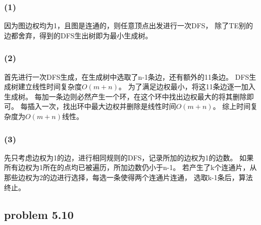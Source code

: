 \documentclass[11pt,a4paper,oneside,oldfontcommands]{ctexart}
\begin{document}
\subsubsection*{(1)}
因为图边权均为1，且图是连通的，则任意顶点出发进行一次DFS，
除了TE别的边都舍弃，得到的DFS生出树即为最小生成树。
\subsubsection*{(2)}
首先进行一次DFS生成，在生成树中选取了n-1条边，还有额外的11条边。
DFS生成树建立线性时间复杂度$O(m+n)$。
为了满足边权最小，将这11条边逐一加入生成树。
每加一条边则必然产生一个环，在这个环中找出边权最大的将其删除即可。
每插入一次，找出环中最大边权并删除是线性时间$O(m+n)$。
综上时间复杂度为$O(m+n)线性$。
\subsubsection*{(3)}
先只考虑边权为1的边，进行相同规则的DFS，记录所加的边权为1的边数。
如果所有边权为1所在的点均已被遍历，所加边数仍小于n-1。
若产生了k个连通片，从那些边权为2的边进行选择，每选一条使得两个连通片连通，
选取k-1条后，算法终止。
\newpage
{\subsection*{problem 5.10}}
\end{document}
